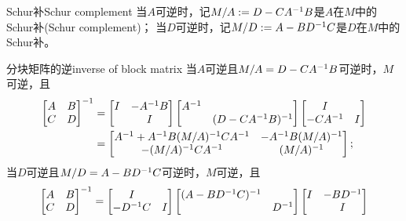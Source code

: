 \begin{definition}
	{Schur补}{Schur complement}
	当$A$可逆时，记$M/A := D - CA^{-1} B$是$A$在$M$中的Schur补(Schur complement)；
	当$D$可逆时，记$M/D := A - BD^{-1} C$是$D$在$M$中的Schur补。
\end{definition}

\begin{theorem}
	{分块矩阵的逆}{inverse of block matrix}
	当$A$可逆且$M/A = D - CA^{-1} B$可逆时，$M$可逆，且
	\begin{subequations}
		\begin{align}
			\begin{bmatrix}
				A&B\\C&D
			\end{bmatrix}^{-1} &= \begin{bmatrix}
				I&-A^{-1} B\\ &I
			\end{bmatrix}\begin{bmatrix}
				A^{-1}\\ &(D - CA^{-1} B)^{-1}
			\end{bmatrix}\begin{bmatrix}
				I\\-CA^{-1}&I
			\end{bmatrix}\\
			\label{eqn:[AB;CD]-1=M/A}
			&= \begin{bmatrix}
				A^{-1} + A^{-1} B(M/A)^{-1} CA^{-1}&-A^{-1} B(M/A)^{-1}\\
				-(M/A)^{-1} CA^{-1}&(M/A)^{-1}
			\end{bmatrix};
		\end{align}
	\end{subequations}
	当$D$可逆且$M/D = A - BD^{-1} C$可逆时，$M$可逆，且
	\begin{subequations}
		\begin{align}
			\begin{bmatrix}
				A&B\\C&D
			\end{bmatrix}\inv &= \begin{bmatrix}
				I\\-D\inv C&I
			\end{bmatrix}\begin{bmatrix}
				(A - BD\inv C)\inv\\ &D\inv
			\end{bmatrix}\begin{bmatrix}
				I&-BD\inv\\ &I
			\end{bmatrix}\\

\end{align}
\end{subequations}
\end{theorem}
